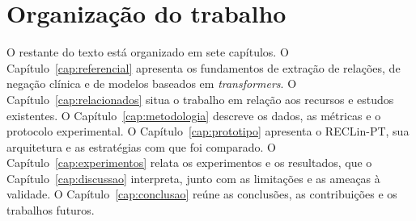 \section{Organização do trabalho}

O restante do texto está organizado em sete capítulos. O
Capítulo~\ref{cap:referencial} apresenta os fundamentos de extração de relações, de
negação clínica e de modelos baseados em \emph{transformers}. O
Capítulo~\ref{cap:relacionados} situa o trabalho em relação aos recursos e estudos
existentes. O Capítulo~\ref{cap:metodologia} descreve os dados, as métricas e o
protocolo experimental. O Capítulo~\ref{cap:prototipo} apresenta o RECLin-PT, sua
arquitetura e as estratégias com que foi comparado. O
Capítulo~\ref{cap:experimentos} relata os experimentos e os resultados, que o
Capítulo~\ref{cap:discussao} interpreta, junto com as limitações e as ameaças à
validade. O Capítulo~\ref{cap:conclusao} reúne as conclusões, as contribuições e os
trabalhos futuros.
